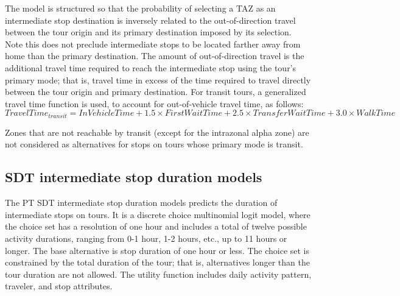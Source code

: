 \noindent The model is structured so that the probability of selecting a TAZ as an intermediate stop destination is inversely related to the out-of-direction travel between the tour origin and its primary destination imposed by its selection. Note this does not preclude intermediate stops to be located farther away from home than the primary destination. The amount of out-of-direction travel is the additional travel time required to reach the intermediate stop using the tour's primary mode; that is, travel time in excess of the time required to travel directly between the tour origin and primary destination. For transit tours, a generalized travel time function is used, to account for out-of-vehicle travel time, as follows:
\begin{equation}
TravelTime_{transit} = InVehicleTime + 1.5 \times FirstWaitTime + 2.5 \times TransferWaitTime + 3.0 \times WalkTime
\end{equation}

Zones that are not reachable by transit (except for the intrazonal alpha zone) are not considered as alternatives for stops on tours whose primary mode is transit.

\subsection{SDT intermediate stop duration models}\label{sec:sdt-intermediate-stop-duration}
The PT SDT intermediate stop duration models predicts the duration of intermediate stops on tours. It is a discrete choice multinomial logit model, where the choice set has a resolution of one hour and includes a total of twelve possible activity durations, ranging from 0-1 hour, 1-2 hours, etc., up to 11 hours or longer. The base alternative is stop duration of one hour or less. The choice set is constrained by the total duration of the tour; that is, alternatives longer than the tour duration are not allowed. The utility function includes daily activity pattern, traveler, and stop attributes. 

